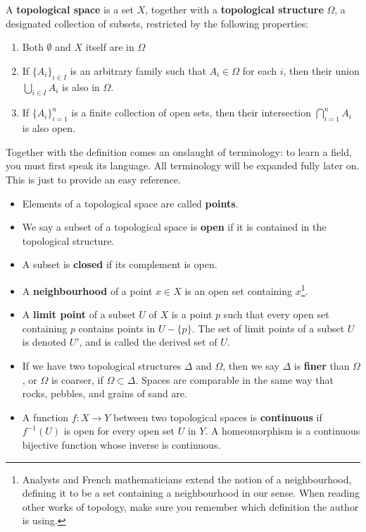 \begin{definition}
    A {\bf topological space} is a set $X$, together with a {\bf topological structure} $\Omega$, a designated collection of subsets, restricted by the following properties:
    \begin{enumerate}
        \item Both $\emptyset$ and $X$ itself are in $\Omega$
        \item If $\{A_i\}_{i \in I}$ is an arbitrary family such that $A_i \in \Omega$ for each $i$, then their union $\bigcup_{i \in I} A_i$ is also in $\Omega$.
        \item If $\{A_i\}_{i = 1}^n$ is a finite collection of open sets, then their intersection $\bigcap_{i = 1}^n A_i$ is also open.
    \end{enumerate}
\end{definition}

Together with the definition comes an onslaught of terminology: to learn a field, you must first speak its language. All terminology will be expanded fully later on. This is just to provide an easy reference.

\begin{itemize}
    \item Elements of a topological space are called {\bf points}.
    \item We say a subset of a topological space is {\bf open} if it is contained in the topological structure.
    \item A subset is {\bf closed} if its complement is open.
    \item A {\bf neighbourhood} of a point $x \in X$ is an open set containing $x$\footnote{Analysts and French mathematicians extend the notion of a neighbourhood, defining it to be a set containing a neighbourhood in our sense. When reading other works of topology, make sure you remember which definition the author is using.}.
    \item A {\bf limit point} of a subset $U$ of $X$ is a point $p$ such that every open set containing $p$ contains points in $U - \{p\}$. The set of limit points of a subset $U$ is denoted $U'$, and is called the derived set of $U$.
    \item If we have two topological structures $\Delta$ and $\Omega$, then we say $\Delta$ is {\bf finer} than $\Omega$, or $\Omega$ is coarser, if $\Omega \subset \Delta$. Spaces are comparable in the same way that rocks, pebbles, and grains of sand are.
    \item A function $f:X \to Y$ between two topological spaces is {\bf continuous} if $f^{-1}(U)$ is open for every open set $U$ in $Y$. A homeomorphism is a continuous bijective function whose inverse is continuous.
\end{itemize}

